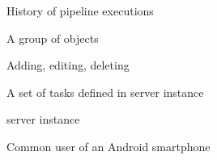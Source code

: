 \item[History] History of pipeline executions
\item[List] A group of objects
\item[Managing] Adding, editing, deleting
\item[Pipeline] A set of tasks defined in \etl{} server instance
\item[Server instance] \etl{} server instance
\item[User] Common user of an Android smartphone